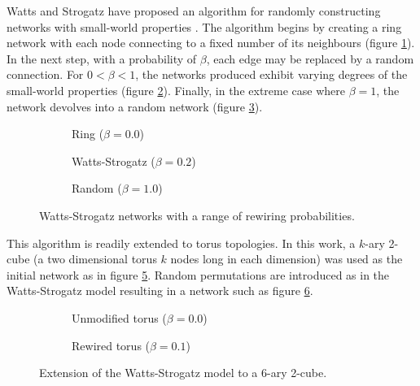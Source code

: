 			Watts and Strogatz have proposed an algorithm for randomly constructing
			networks with small-world properties \cite{watts98}. The algorithm begins
			by creating a ring network with each node connecting to a fixed number of
			its neighbours (figure \ref{fig:ringNetworkB0}). In the next step, with a
			probability of $\beta$, each edge may be replaced by a random connection.
			For $0 < \beta < 1$, the networks produced exhibit varying degrees of the
			small-world properties (figure \ref{fig:ringNetworkB02}).  Finally, in the
			extreme case where $\beta=1$, the network devolves into a random network
			(figure \ref{fig:ringNetworkB1}).
			
			\begin{figure}
				\center
				\begin{subfigure}[t]{0.3\textwidth}
					\center
					
					\caption{Ring ($\beta = 0.0$)}
					\label{fig:ringNetworkB0}
				\end{subfigure}
				\begin{subfigure}[t]{0.3\textwidth}
					\center
					
					\caption{Watts-Strogatz ($\beta = 0.2$)}
					\label{fig:ringNetworkB02}
				\end{subfigure}
				\begin{subfigure}[t]{0.3\textwidth}
					\center
					
					\caption{Random ($\beta = 1.0$)}
					\label{fig:ringNetworkB1}
				\end{subfigure}
				
				\caption{Watts-Strogatz networks with a range of rewiring
				probabilities.}
				\label{fig:ringNetwork}
			\end{figure}
			
			This algorithm is readily extended to torus topologies. In this work, a
			$k$-ary 2-cube (a two dimensional torus $k$ nodes long in each dimension)
			was used as the initial network as in figure \ref{fig:torusNetworkB0}.
			Random permutations are introduced as in the Watts-Strogatz model
			resulting in a network such as figure \ref{fig:torusNetworkB01}.
			
			\begin{figure}
				\center
				\begin{subfigure}[t]{0.45\textwidth}
					\center
					
					\caption{Unmodified torus ($\beta=0.0$)}
					\label{fig:torusNetworkB0}
				\end{subfigure}
				\begin{subfigure}[t]{0.45\textwidth}
					\center
					
					\caption{Rewired torus ($\beta=0.1$)}
					\label{fig:torusNetworkB01}
				\end{subfigure}
				
				\caption{Extension of the Watts-Strogatz model to a 6-ary 2-cube.}
				\label{fig:torusNetwork}
			\end{figure}
			
